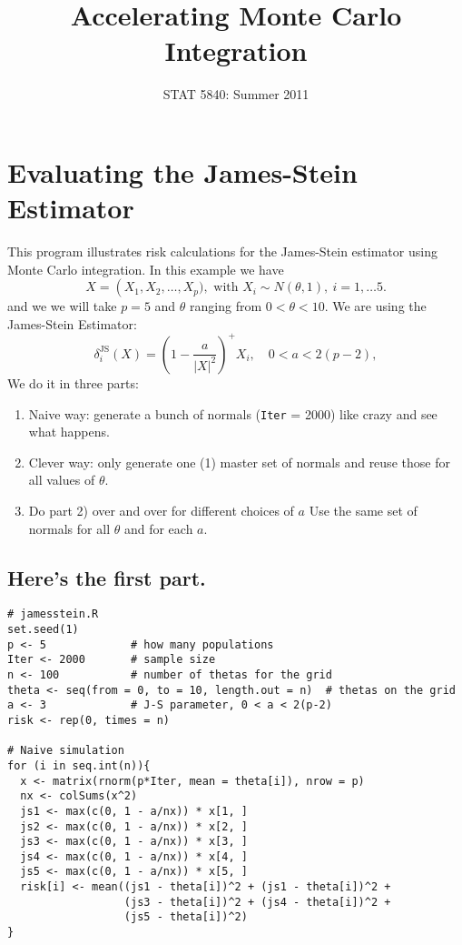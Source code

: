 \documentclass[11pt,english]{article}
\title{Accelerating Monte Carlo Integration}
\date{STAT 5840: Summer 2011}
\begin{document}
\maketitle

\thispagestyle{empty}

\section*{Evaluating the James-Stein Estimator}
\label{sec-1}

This program illustrates risk calculations for the James-Stein estimator using Monte Carlo integration.  In this example we have 
\[
X = \left( X_{1},X_{2},\ldots,X_{p}),\mbox{ with }X_{i}\sim N(\theta,1),\ i=1,\ldots 5. 
\]
and we we will take $p = 5$ and $\theta$ ranging from $0 < \theta < 10$. We are using the James-Stein Estimator:
\[
\delta_{i}^{\mathrm{JS}}(X) = \left(1 - \frac{a}{|X|^{2}} \right)^{+} X_{i}, \quad 0 < a < 2(p - 2),
\]
 We do it in three parts:

\begin{enumerate}
\item Naive way: generate a bunch of normals (\texttt{Iter} = 2000) like crazy and see what happens.
\item Clever way: only generate one (1) master set of normals and reuse those for all values of $\theta$.
\item Do part 2) over and over for different choices of $a$  Use the same set of normals for all $\theta$ and for each $a$.
\end{enumerate}
\subsection*{Here's the first part.}
\label{sec-1_1}


\begin{verbatim}
# jamesstein.R
set.seed(1)
p <- 5             # how many populations
Iter <- 2000       # sample size
n <- 100           # number of thetas for the grid
theta <- seq(from = 0, to = 10, length.out = n)  # thetas on the grid
a <- 3             # J-S parameter, 0 < a < 2(p-2)
risk <- rep(0, times = n)

# Naive simulation
for (i in seq.int(n)){
  x <- matrix(rnorm(p*Iter, mean = theta[i]), nrow = p)
  nx <- colSums(x^2)
  js1 <- max(c(0, 1 - a/nx)) * x[1, ]
  js2 <- max(c(0, 1 - a/nx)) * x[2, ]
  js3 <- max(c(0, 1 - a/nx)) * x[3, ]
  js4 <- max(c(0, 1 - a/nx)) * x[4, ]
  js5 <- max(c(0, 1 - a/nx)) * x[5, ]
  risk[i] <- mean((js1 - theta[i])^2 + (js1 - theta[i])^2 + 
                  (js3 - theta[i])^2 + (js4 - theta[i])^2 + 
                  (js5 - theta[i])^2)
}
\end{verbatim}
\end{document}
